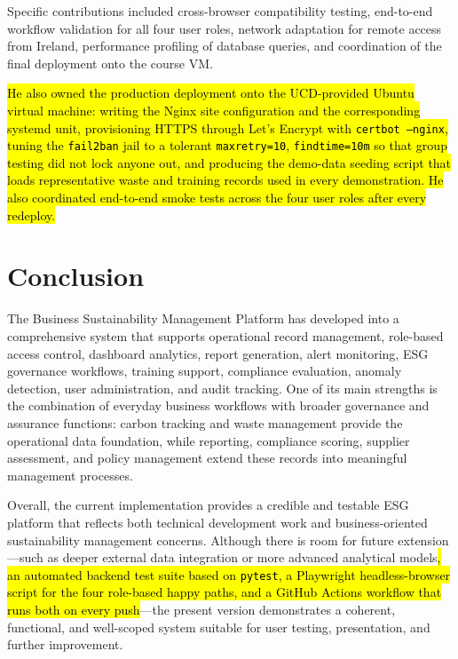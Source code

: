 \documentclass[11pt,a4paper]{article}
\newcommand{\new}[1]{\hl{#1}}
\begin{document}
Specific contributions included cross-browser compatibility testing, end-to-end workflow validation for all four user roles, network adaptation for remote access from Ireland, performance profiling of database queries, and coordination of the final deployment onto the course VM.

\new{He also owned the production deployment onto the UCD-provided Ubuntu virtual machine: writing the Nginx site configuration and the corresponding systemd unit, provisioning HTTPS through Let's Encrypt with \texttt{certbot --nginx}, tuning the \texttt{fail2ban} jail to a tolerant \texttt{maxretry=10}, \texttt{findtime=10m} so that group testing did not lock anyone out, and producing the demo-data seeding script that loads representative waste and training records used in every demonstration. He also coordinated end-to-end smoke tests across the four user roles after every redeploy.}

\section{Conclusion}
The Business Sustainability Management Platform has developed into a comprehensive system that supports operational record management, role-based access control, dashboard analytics, report generation, alert monitoring, ESG governance workflows, training support, compliance evaluation, anomaly detection, user administration, and audit tracking. One of its main strengths is the combination of everyday business workflows with broader governance and assurance functions: carbon tracking and waste management provide the operational data foundation, while reporting, compliance scoring, supplier assessment, and policy management extend these records into meaningful management processes.

Overall, the current implementation provides a credible and testable ESG platform that reflects both technical development work and business-oriented sustainability management concerns. Although there is room for future extension---such as deeper external data integration or more advanced analytical models\new{, an automated backend test suite based on \texttt{pytest}, a Playwright headless-browser script for the four role-based happy paths, and a GitHub Actions workflow that runs both on every push}---the present version demonstrates a coherent, functional, and well-scoped system suitable for user testing, presentation, and further improvement.
\end{document}
